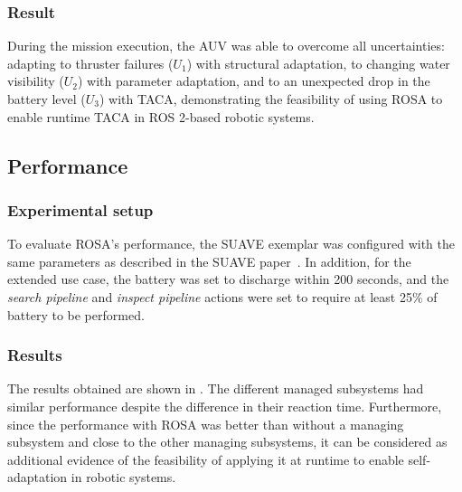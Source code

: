\subsubsection{Result} During the mission execution, the AUV was able to overcome all uncertainties: adapting to thruster failures ($U_1$) with structural adaptation, to changing water visibility ($U_2$) with parameter adaptation, and to an unexpected drop in the battery level ($U_3$) with TACA, demonstrating the feasibility of using ROSA to enable runtime TACA in ROS 2-based robotic systems.

\subsection{Performance}

\subsubsection{Experimental setup} To evaluate ROSA's performance, the SUAVE exemplar was configured with the same parameters as described in the SUAVE paper~\citep{suave}. In addition, for the extended use case, the battery was set to discharge within 200 seconds, and the \textit{search pipeline} and \textit{inspect pipeline} actions were set to require at least 25\% of battery to be performed.

\subsubsection{Results}
The results obtained are shown in .
The different managed subsystems had similar performance despite the difference in their reaction time. Furthermore, since the performance with ROSA was better than without a managing subsystem and close to the other
 managing subsystems, it can be considered as additional evidence of the feasibility of applying it at runtime to enable self-adaptation in robotic systems.

